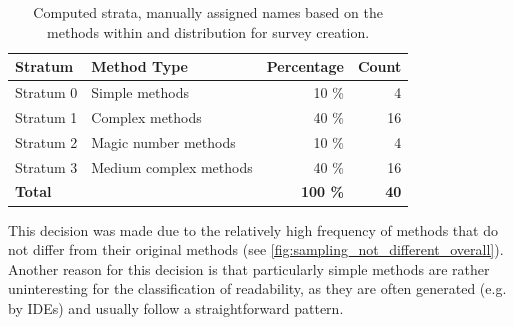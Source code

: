 \documentclass[%
class=scrreprt,
chapterprefix=false,%
open=right,%
twoside=false,%
paper=a4,%
logofile={Logo\_zentral\_farbig\_EN.png},%
thesistype=master,%
UKenglish,%
]{se2thesis}
\theoremstyle{definition}
\begin{document}
%
	
	\begin{table}[tb]
		\centering
		\caption{Computed strata, manually assigned names based on the methods within and distribution for survey creation.} 
		\vspace{8pt}
		\label{tab:strata_info}
		\begin{tabular}{llrr}
			\toprule
			Stratum & Method Type & Percentage & Count \\
			\midrule
			Stratum 0 & Simple methods & 10 \% & 4 \\
			Stratum 1 & Complex methods & 40 \% & 16 \\
			Stratum 2 & Magic number methods & 10 \% & 4 \\
			Stratum 3 & Medium complex methods & 40 \% & 16 \\
			\midrule
			\textbf{Total} & \textbf{} & \textbf{100 \%} & \textbf{40} \\
			\bottomrule
		\end{tabular}
	\end{table}
	
	This decision was made due to the relatively high frequency of methods that do not differ from their original methods (see \autoref{fig:sampling_not_different_overall}). Another reason for this decision is that particularly simple methods are rather uninteresting for the classification of readability, as they are often generated (e.g. by IDEs) and usually follow a straightforward pattern.
	
	
\end{document}
